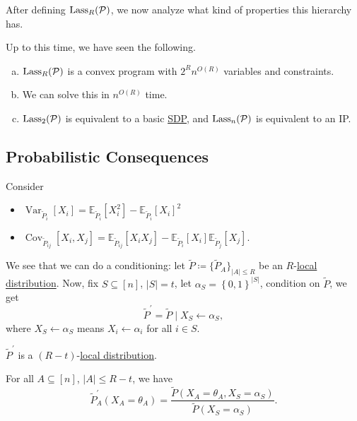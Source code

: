 After defining \(\mathop{\mathrm{Lass}}_R(\mathcal{\MakeUppercase{p}} )\), we now analyze what kind of properties this hierarchy has.

\begin{remark}
	Up to this time, we have seen the following.
	\begin{enumerate}[(a)]
		\item \(\mathop{\mathrm{Lass}}_R(\mathcal{\MakeUppercase{p}})\) is a convex program with \(2^R n^{O(R)}\) variables and constraints.
		\item We can solve this in \(n^{O(R)}\) time.
		\item \(\mathop{\mathrm{Lass}}_2(\mathcal{\MakeUppercase{p}})\) is equivalent to a basic \hyperref[def:SDP]{SDP}, and \(\mathop{\mathrm{Lass}}_n(\mathcal{\MakeUppercase{p}})\) is equivalent to an IP.
	\end{enumerate}
\end{remark}


\subsection{Probabilistic Consequences}
Consider
\begin{itemize}
	\item \(\mathop{\mathrm{Var}}_{\widetilde{P} _i}\left[ X_i \right] = \mathbb{E}_{\widetilde{P} _i}\left[ X_i ^{2} \right] - \mathbb{E}_{\widetilde{P} _i}\left[ X_i \right]^{2}  \)
	\item \(\mathop{\mathrm{Cov}}_{\widetilde{P} _{ij}}\left[ X_i, X_j\right] = \mathbb{E}_{\widetilde{P} _{ij}}\left[ X_i X_j\right] - \mathbb{E}_{\widetilde{P} _{i}}\left[ X_i \right] \mathbb{E}_{\widetilde{P} _{j}}\left[ X_j\right]  \).
\end{itemize}
We see that we can do a conditioning: let \(\widetilde{P} \coloneqq \{ \widetilde{P} _{A} \} _{\left\vert A \right\vert \leq R}\) be an \(R\)-\hyperref[def:local-distribution]{local distribution}. Now, fix \(S \subseteq [n]\), \(\left\vert S \right\vert = t\), let \(\alpha _S = \left\{ 0, 1 \right\} ^{\left\vert S \right\vert }\), condition on \(\widetilde{P} \), we get
\[
	\widetilde{P} ^\prime = \widetilde{P} \mid X_S \gets \alpha _S,
\]
where \(X_S\gets \alpha _S\) means \(X_i \gets \alpha _i\) for all \(i\in S\).
\begin{remark}
	\(\widetilde{P} ^\prime \) is a \((R-t)\)-\hyperref[def:local-distribution]{local distribution}.
\end{remark}
\begin{explanation}
	For all \(A \subseteq [n]\), \(\left\vert A \right\vert \leq R-t\), we have
	\[
		\widetilde{P} ^\prime _A (X_A = \theta _A) = \frac{\widetilde{P} (X_A = \theta _A, X_S = \alpha _S)}{\widetilde{P} (X_S = \alpha _S)}.
	\]
\end{explanation}

